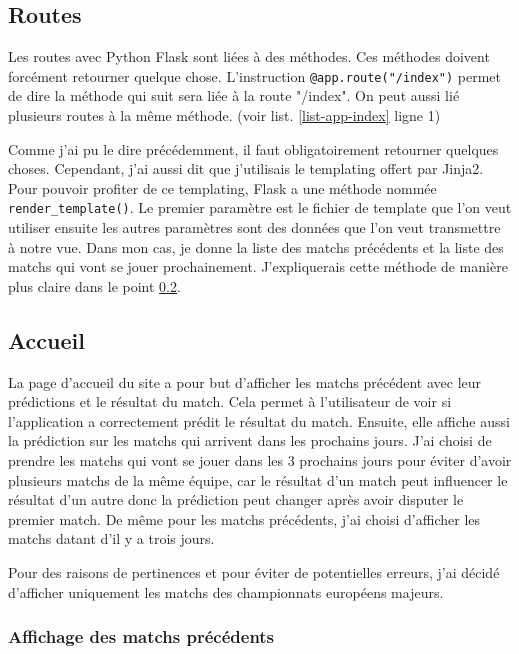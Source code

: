 \documentclass[a4paper,14pt]{extarticle}
\begin{document}
{\subsection{Routes}

Les routes avec Python Flask sont liées à des méthodes. Ces méthodes doivent forcément retourner quelque chose. L'instruction \texttt{@app.route("/index")} permet de dire la méthode qui suit sera liée à la route "/index". On peut aussi lié plusieurs routes à la même méthode. (voir list. \ref{list-app-index} ligne 1)


Comme j'ai pu le dire précédemment, il faut obligatoirement retourner quelques choses. Cependant, j'ai aussi dit que j'utilisais le templating offert par Jinja2. Pour pouvoir profiter de ce templating, Flask a une méthode nommée \texttt{render\_template()}. Le premier paramètre est le fichier de template que l'on veut utiliser ensuite les autres paramètres sont des données que l'on veut transmettre à notre vue. Dans mon cas, je donne la liste des matchs précédents et la liste des matchs qui vont se jouer prochainement. J'expliquerais cette méthode de manière plus claire dans le point \ref{flaskAccueil}.

\subsection{Accueil}
\label{flaskAccueil}

La page d'accueil du site a pour but d'afficher les matchs précédent avec leur prédictions et le résultat du match. Cela permet à l'utilisateur de voir si l'application a correctement prédit le résultat du match. Ensuite, elle affiche aussi la prédiction sur les matchs qui arrivent dans les prochains jours. J'ai choisi de prendre les matchs qui vont se jouer dans les 3 prochains jours pour éviter d'avoir plusieurs matchs de la même équipe, car le résultat d'un match peut influencer le résultat d'un autre donc la prédiction peut changer après avoir disputer le premier match. De même pour les matchs précédents, j'ai choisi d'afficher les matchs datant d'il y a trois jours.

Pour des raisons de pertinences et pour éviter de potentielles erreurs, j'ai décidé d'afficher uniquement les matchs des championnats européens majeurs.

\subsubsection{Affichage des matchs précédents}

}
\end{document}
